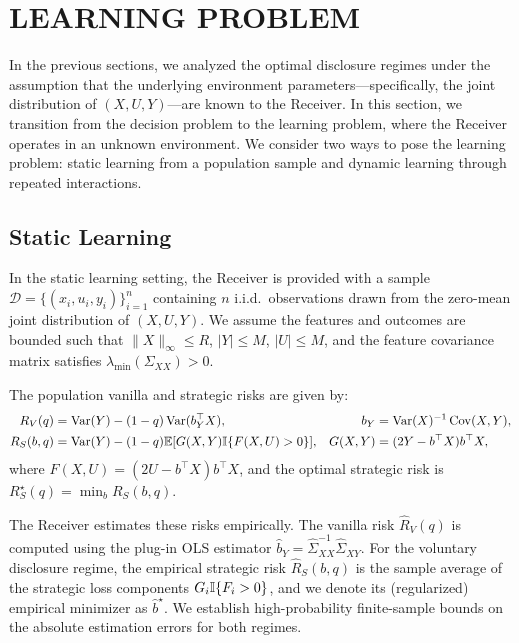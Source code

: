 \section{LEARNING PROBLEM}
\label{sec:learning}

In the previous sections, we analyzed the optimal disclosure regimes under the assumption that the underlying environment parameters—specifically, the joint distribution of $(X, U, Y)$—are known to the Receiver. In this section, we transition from the decision problem to the learning problem, where the Receiver operates in an unknown environment. We consider two ways to pose the learning problem: static learning from a population sample and dynamic learning through repeated interactions.

\subsection{Static Learning}
\label{subsec:static_learning}
In the static learning setting, the Receiver is provided with a sample $\mathcal{D} = \{(x_i, u_i, y_i)\}_{i=1}^n$ containing $n$ i.i.d.\ observations drawn from the zero-mean joint distribution of $(X,U,Y)$. We assume the features and outcomes are bounded such that $\|X\|_\infty \le R$, $|Y| \le M$, $|U| \le M$, and the feature covariance matrix satisfies $\lambda_{\min}(\Sigma_{XX}) > 0$.

The population vanilla and strategic risks are given by:
\begin{align*}
R_V(q) &= \operatorname{Var}(Y) - (1-q)\operatorname{Var}(b_Y^\top X), &
b_Y &= \operatorname{Var}(X)^{-1}\operatorname{Cov}(X,Y), \\
R_S(b,q) &= \operatorname{Var}(Y) - (1-q)\mathbb{E}[G(X,Y)\mathbb{I}\{F(X,U)>0\}], &
G(X,Y) &= (2Y - b^\top X)b^\top X, 
\end{align*}
where $F(X,U) = (2U - b^\top X)b^\top X$, and the optimal strategic risk is $R_S^\star(q) = \min_b R_S(b, q)$.

The Receiver estimates these risks empirically. The vanilla risk $\hat{R}_V(q)$ is computed using the plug-in OLS estimator $\hat{b}_Y = \hat{\Sigma}_{XX}^{-1}\hat{\Sigma}_{XY}$. For the voluntary disclosure regime, the empirical strategic risk $\hat{R}_S(b,q)$ is the sample average of the strategic loss components $G_i \mathbb{I}\{F_i > 0\}$, and we denote its (regularized) empirical minimizer as $\hat{b}^\star$. We establish high-probability finite-sample bounds on the absolute estimation errors for both regimes.

